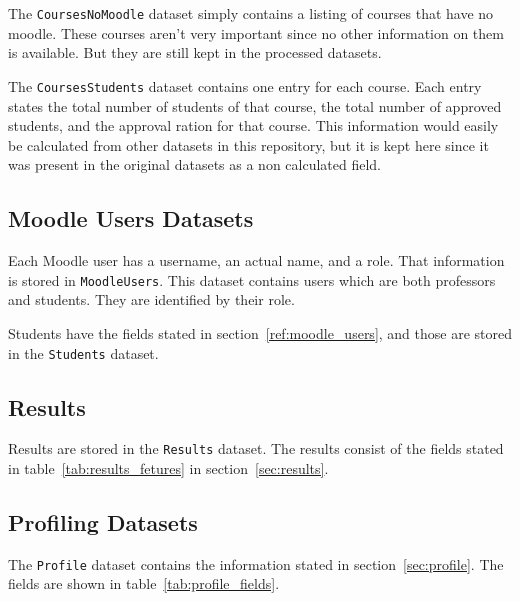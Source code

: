 The \texttt{CoursesNoMoodle} dataset simply contains a listing of courses that
have no moodle. These courses aren't very important since no other information
on them is available. But they are still kept in the processed datasets.

The \texttt{CoursesStudents} dataset contains one entry for each course. Each
entry states the total number of students of that course, the total number of
approved students, and the approval ration for that course. This information
would easily be calculated from other datasets in this repository, but it is
kept here since it was present in the original datasets as a non calculated
field.

\subsection{Moodle Users Datasets}

Each Moodle user has a username, an actual name, and a role. That information
is stored in \texttt{MoodleUsers}. This dataset contains users which are both
professors and students. They are identified by their role.

Students have the fields stated in section~\ref{ref:moodle_users}, and those
are stored in the \texttt{Students} dataset.

\subsection{Results}

Results are stored in the \texttt{Results} dataset. The results consist of the
fields stated in table~\ref{tab:results_fetures} in section~\ref{sec:results}.

\subsection{Profiling Datasets}

The \texttt{Profile} dataset contains the information stated in
section~\ref{sec:profile}. The fields are shown in
table~\ref{tab:profile_fields}.

